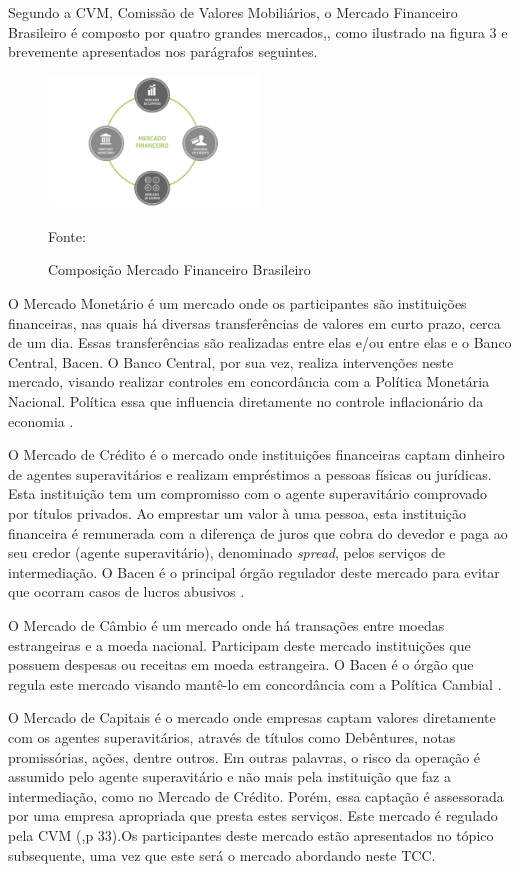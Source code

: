 Segundo a CVM, Comissão de Valores Mobiliários, o Mercado Financeiro Brasileiro é composto por quatro grandes mercados,\cite[p. 15]{cmv2014}, como ilustrado na figura 3 e brevemente apresentados nos parágrafos seguintes.

\begin{figure}[h!]
\centering
\label{f01}
\includegraphics[width=0.5\textwidth]{figuras/f01}
\caption{Composição Mercado Financeiro Brasileiro} {Fonte:\cite{cmv2014}}

\end{figure}

O Mercado Monetário é um mercado onde os participantes são instituições financeiras, nas quais há diversas transferências de valores em curto prazo, cerca de um dia. Essas transferências são realizadas entre elas e/ou entre elas e o Banco Central, Bacen. O Banco Central, por sua vez, realiza intervenções neste mercado, visando realizar controles em concordância com a Política Monetária Nacional. Política essa que influencia diretamente no controle inflacionário da economia \cite[p. 32]{cmv2014}.

O Mercado de Crédito é o mercado onde instituições financeiras captam dinheiro de agentes superavitários e realizam empréstimos a pessoas físicas ou jurídicas. Esta instituição tem um compromisso com o agente superavitário comprovado por títulos privados. Ao emprestar um valor à uma pessoa, esta instituição financeira é remunerada com a diferença de juros que cobra do devedor e paga ao seu credor (agente superavitário), denominado \textit{spread}, pelos serviços de intermediação. O Bacen é o principal órgão regulador deste mercado para evitar que ocorram casos de lucros abusivos \cite[p. 32]{cmv2014}.

O Mercado de Câmbio é um mercado onde há transações entre moedas estrangeiras e a moeda nacional. Participam deste mercado instituições que possuem despesas ou receitas em moeda estrangeira. O Bacen é o órgão que regula este mercado visando mantê-lo em concordância com a Política Cambial \cite[p. 32]{cmv2014}.

O Mercado de Capitais é o mercado onde empresas captam valores diretamente com os agentes superavitários, através de títulos como Debêntures, notas promissórias, ações, dentre outros. Em outras palavras, o risco da operação é assumido pelo agente superavitário e não mais pela instituição que faz a intermediação, como no Mercado de Crédito. Porém, essa captação é assessorada por uma empresa apropriada que presta estes serviços. Este mercado é regulado pela CVM (\citeyear{cmv2014},p 33).Os participantes deste mercado estão apresentados no tópico subsequente, uma vez que este será o mercado abordando neste TCC.

